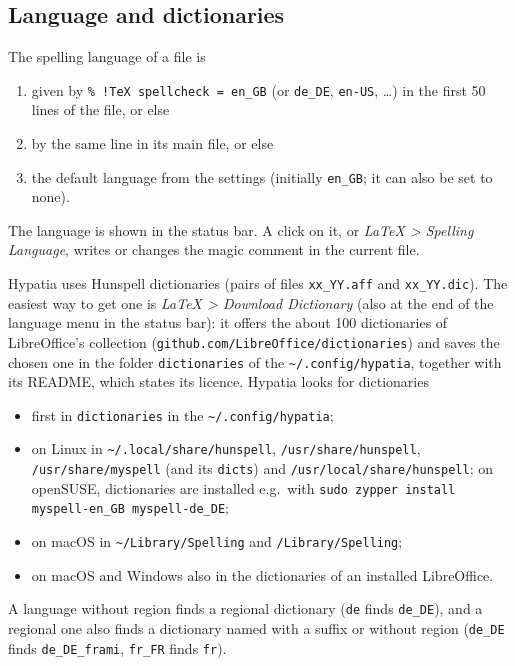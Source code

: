 \documentclass[11pt]{article}
\newcommand{\menu}[1]{\textsf{\textit{#1}}}
\newcommand{\file}[1]{\texttt{#1}}
\newcommand{\cfgdir}{\texttt{\textasciitilde/.config/hypatia}}
\begin{document}
    \subsection{Language and dictionaries}

    The spelling language of a file is
    \begin{enumerate}
        \itemsep-1mm
        \item given by \verb+% !TeX spellcheck = en_GB+ (or \verb+de_DE+, \verb+en-US+, \ldots) in the first 50 lines of the file, or else
        \item by the same line in its main file, or else
        \item the default language from the settings (initially \verb+en_GB+; it can also be set to none).
    \end{enumerate}
    The language is shown in the status bar. A click on it, or \menu{LaTeX > Spelling Language}, writes or changes the magic comment in the current file.

Hypatia uses Hunspell dictionaries (pairs of files \verb+xx_YY.aff+ and \verb+xx_YY.dic+). The easiest way to get one is \menu{LaTeX > Download Dictionary} (also at the end of the language menu in the status bar): it offers the about 100 dictionaries of LibreOffice's collection (\texttt{github.com/\allowbreak LibreOffice/\allowbreak dictionaries}) and saves the chosen one in the folder \file{dictionaries} of the \cfgdir, together with its README, which states its licence. Hypatia looks for dictionaries
    \begin{itemize}
        \itemsep-1mm
        \item first in \file{dictionaries} in the \cfgdir;
        \item on Linux in \file{\textasciitilde/.local/share/hunspell}, \file{/usr/share/hunspell}, \file{/usr/share/myspell} (and its \file{dicts}) and \file{/usr/local/share/hunspell}; on openSUSE, dictionaries are installed e.g.\ with \verb+sudo zypper install myspell-en_GB myspell-de_DE+;
        \item on macOS in \file{\textasciitilde/Library/Spelling} and \file{/Library/Spelling};
        \item on macOS and Windows also in the dictionaries of an installed LibreOffice.
    \end{itemize}
    A language without region finds a regional dictionary (\verb+de+ finds \verb+de_DE+), and a regional one also finds a dictionary named with a suffix or without region (\verb+de_DE+ finds \verb+de_DE_frami+, \verb+fr_FR+ finds \verb+fr+).
\end{document}
